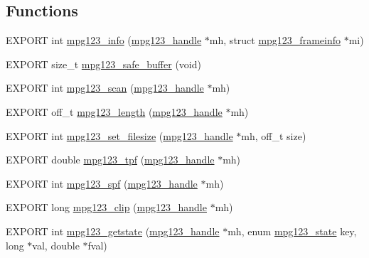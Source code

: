 \subsection*{Functions}
\begin{DoxyCompactItemize}
\item 
E\+X\+P\+O\+RT int \hyperlink{group__mpg123__status_gad95415748b8b1bb0addcea7119435a91}{mpg123\+\_\+info} (\hyperlink{group__mpg123__init_ga6728e2839a395f3a07d4514da659faca}{mpg123\+\_\+handle} $\ast$mh, struct \hyperlink{structmpg123__frameinfo}{mpg123\+\_\+frameinfo} $\ast$mi)
\item 
E\+X\+P\+O\+RT size\+\_\+t \hyperlink{group__mpg123__status_gac5d057e3d7e859fc5cdf24dd34735233}{mpg123\+\_\+safe\+\_\+buffer} (void)
\item 
E\+X\+P\+O\+RT int \hyperlink{group__mpg123__status_ga42e4ddc8d68580ef11105a7c017862a0}{mpg123\+\_\+scan} (\hyperlink{group__mpg123__init_ga6728e2839a395f3a07d4514da659faca}{mpg123\+\_\+handle} $\ast$mh)
\item 
E\+X\+P\+O\+RT off\+\_\+t \hyperlink{group__mpg123__status_gad61062a7c127fda0d1ccee4ca0db37b4}{mpg123\+\_\+length} (\hyperlink{group__mpg123__init_ga6728e2839a395f3a07d4514da659faca}{mpg123\+\_\+handle} $\ast$mh)
\item 
E\+X\+P\+O\+RT int \hyperlink{group__mpg123__status_gad09ab0cda80f6e5df22d67828ffbaa20}{mpg123\+\_\+set\+\_\+filesize} (\hyperlink{group__mpg123__init_ga6728e2839a395f3a07d4514da659faca}{mpg123\+\_\+handle} $\ast$mh, off\+\_\+t size)
\item 
E\+X\+P\+O\+RT double \hyperlink{group__mpg123__status_ga90e18f73bbbee0898339616d0093059b}{mpg123\+\_\+tpf} (\hyperlink{group__mpg123__init_ga6728e2839a395f3a07d4514da659faca}{mpg123\+\_\+handle} $\ast$mh)
\item 
E\+X\+P\+O\+RT int \hyperlink{group__mpg123__status_gab8c1a8ff5a39ba8537dfdd9e20283744}{mpg123\+\_\+spf} (\hyperlink{group__mpg123__init_ga6728e2839a395f3a07d4514da659faca}{mpg123\+\_\+handle} $\ast$mh)
\item 
E\+X\+P\+O\+RT long \hyperlink{group__mpg123__status_ga59839a0559e87a7c349c4e6665ef8f8b}{mpg123\+\_\+clip} (\hyperlink{group__mpg123__init_ga6728e2839a395f3a07d4514da659faca}{mpg123\+\_\+handle} $\ast$mh)
\item 
E\+X\+P\+O\+RT int \hyperlink{group__mpg123__status_ga8653976358b74381e9eb254980503f3c}{mpg123\+\_\+getstate} (\hyperlink{group__mpg123__init_ga6728e2839a395f3a07d4514da659faca}{mpg123\+\_\+handle} $\ast$mh, enum \hyperlink{group__mpg123__status_gadfc90f3072f8c1fe32dd88854f6afb28}{mpg123\+\_\+state} key, long $\ast$val, double $\ast$fval)
\end{DoxyCompactItemize}


